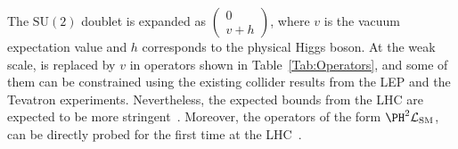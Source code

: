 \documentclass[a4paper,11pt]{article}
\begin{document}

The $\textrm{SU}(2)$ doublet \PH is expanded as $\begin{pmatrix} 0 \\ v+h \end{pmatrix}$, where $v$ is the vacuum expectation value  and $h$ corresponds to the physical Higgs boson.
At the weak scale,  \PH is replaced by $v$ in operators shown in Table~\ref{Tab:Operators}, and some of them can be constrained using the existing collider results from  the LEP and the Tevatron experiments.
Nevertheless, the expected bounds from the LHC are expected to be more stringent~\cite{Ellis:2014jta,Grojean:2018dqj}.
Moreover, the operators of the form ${\PH}^2\mathcal{L}_{\text{SM}}$, can be directly probed for the first time at the LHC~\cite{Gupta:2014rxa}. 
\end{document}
